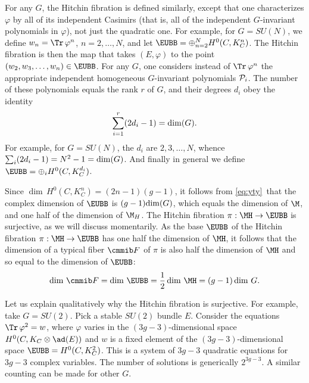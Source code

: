 For any $G$, the Hitchin fibration is defined similarly, except
that one characterizes $\varphi$ by all of its independent
Casimirs (that is, all of the independent $G$-invariant
polynomials in $\varphi$), not just the quadratic one. For
example, for $G=SU(N)$, we  define $w_n=\Tr\,\varphi^n$,
$n=2,\dots,N$, and let ${\EUBB}=\oplus_{n=2}^NH^0(C,K_C^n)$. The
Hitchin fibration is then the map that takes $(E,\varphi)$ to the
point $(w_2,w_3,\dots,w_n)\in {\EUBB}$. For any $G$, one considers
instead of $\Tr\,\varphi^n$ the appropriate independent
homogeneous $G$-invariant polynomials ${\cal P}_i$. The number of
these polynomials equals the rank $r$ of $G$, and their degrees
$d_i$ obey the identity %
\setcounter{equation}{23}
\begin{equation}\label{eq:yty}
\sum_{i=1}^r(2d_i-1)={\rm
dim}(G).
\end{equation}
 For example, for $G=SU(N)$, the $d_i$ are $2,3,\dots,N$,
whence $\sum_i(2d_i-1)=N^2-1={\rm dim}(G)$.  And finally in
general we define ${\EUBB}=\oplus_i H^0(C,K_C^{d_i})$.

\def\CMF{{\cmmib F}}
Since $\dim \,H^0(C,K_C^n)=(2n-1)(g-1)$, it follows from \eqref{eq:yty}\
that the complex dimension of ${\EUBB}$ is $(g-1){\rm dim}(G)$,
which equals the dimension of $\M$, and  one half of the dimension
of $\M_H$. The Hitchin fibration $\pi:\MH\to {\EUBB}$ is
surjective, as we will discuss momentarily.   As the base
${\EUBB}$ of the Hitchin fibration $\pi:\MH\to {\EUBB}$ has one
half the dimension of $\MH$, it follows that the dimension of a
typical fiber $\CMF$ of $\pi$ is also half the dimension of $\MH$
and so equal to the dimension of ${\EUBB}$:
\setcounter{equation}{24}
\begin{equation}\label{eq:yrof}
\dim\,\CMF=\dim\,{\EUBB}={1\over
2}\dim\,\MH=(g-1)\dim\,G.
\end{equation}

Let us explain qualitatively why the Hitchin fibration is
surjective. For example, take $G=SU(2)$. Pick a stable $SU(2)$
bundle $E$. Consider the equations $\Tr\,\varphi^2=w$, where
$\varphi $ varies in the $(3g-3)$-dimensional space
$H^0(C,K_C\otimes \ad(E))$ and $w$ is a fixed element of the
$(3g-3)$-dimensional space ${\EUBB}=H^0(C,K_C^2)$. This is a
system of $3g-3$ quadratic equations for $3g-3$ complex variables.
The number of solutions is generically $2^{3g-3}$.  A similar
counting can be made for other $G$.

\par{}

